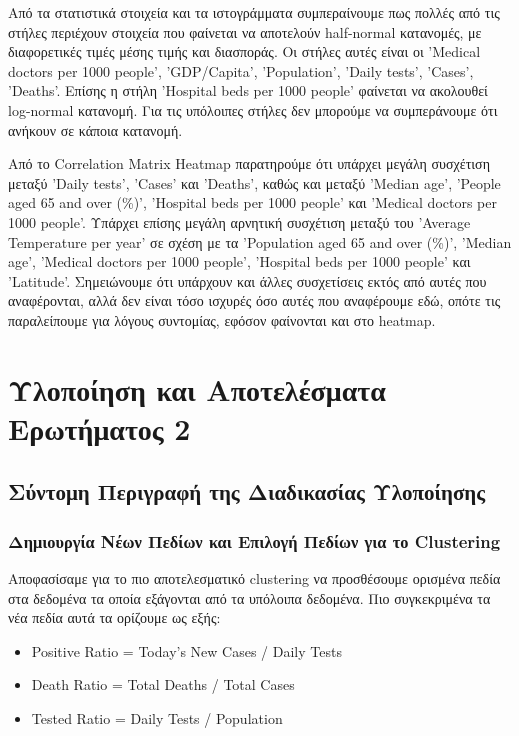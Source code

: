 \documentclass[12pt,a4paper]{article}
\begin{document}
Από τα στατιστικά στοιχεία και τα ιστογράμματα συμπεραίνουμε πως πολλές από τις στήλες περιέχουν στοιχεία που φαίνεται να αποτελούν half-normal κατανομές, με διαφορετικές τιμές μέσης τιμής και διασποράς. Οι στήλες αυτές είναι οι 'Medical doctors per 1000 people', 'GDP/Capita', 'Population', 'Daily tests', 'Cases', 'Deaths'. Επίσης η στήλη 'Hospital beds per 1000 people' φαίνεται να ακολουθεί log-normal κατανομή. Για τις υπόλοιπες στήλες δεν μπορούμε να συμπεράνουμε ότι ανήκουν σε κάποια κατανομή.

Από το Correlation Matrix Heatmap παρατηρούμε ότι υπάρχει μεγάλη συσχέτιση μεταξύ 'Daily tests', 'Cases' και 'Deaths', καθώς και μεταξύ 'Median age', 'People aged 65 and over (\%)', 'Hospital beds per 1000 people' και 'Medical doctors per 1000 people'. Υπάρχει επίσης μεγάλη αρνητική συσχέτιση μεταξύ του 'Average Temperature per year' σε σχέση με τα 'Population aged 65 and over (\%)', 'Median age', 'Medical doctors per 1000 people', 'Hospital beds per 1000 people' και 'Latitude'. Σημειώνουμε ότι υπάρχουν και άλλες συσχετίσεις εκτός από αυτές που αναφέρονται, αλλά δεν είναι τόσο ισχυρές όσο αυτές που αναφέρουμε εδώ, οπότε τις παραλείπουμε για λόγους συντομίας, εφόσον φαίνονται και στο heatmap.

\section{Υλοποίηση και Αποτελέσματα Ερωτήματος 2}

\subsection{Σύντομη Περιγραφή της Διαδικασίας Υλοποίησης}

\subsubsection{Δημιουργία Νέων Πεδίων και Επιλογή Πεδίων για το Clustering}
Αποφασίσαμε για το πιο αποτελεσματικό clustering να προσθέσουμε ορισμένα πεδία στα δεδομένα τα οποία εξάγονται από τα υπόλοιπα δεδομένα. Πιο συγκεκριμένα τα νέα πεδία αυτά τα ορίζουμε ως εξής:

\begin{itemize}
    \item Positive Ratio = Today's New Cases / Daily Tests
    \item Death Ratio = Total Deaths / Total Cases
    \item Tested Ratio = Daily Tests / Population
\end{itemize}
\end{document}
